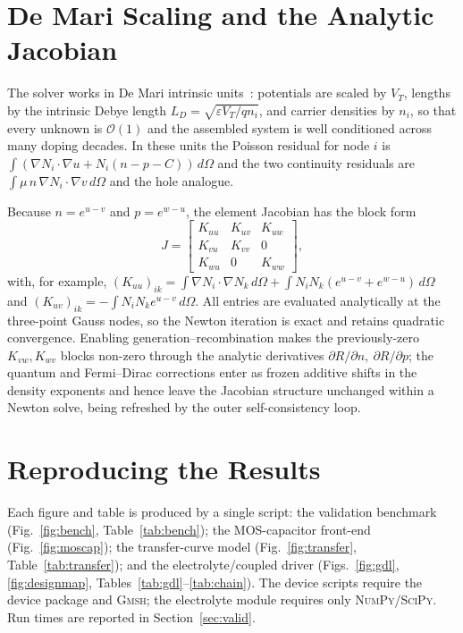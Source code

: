 \documentclass[10pt,journal]{IEEEtran}
\begin{document}
\section{De Mari Scaling and the Analytic Jacobian}
\label{app:scaling}
The solver works in De Mari intrinsic units~\cite{demari1968}: potentials are
scaled by $V_T$, lengths by the intrinsic Debye length
$L_D=\sqrt{\varepsilon V_T/qn_i}$, and carrier densities by $n_i$, so that every
unknown is $\mathcal{O}(1)$ and the assembled system is well conditioned across
many doping decades. In these units the Poisson residual for node $i$ is
$\int(\nabla N_i\!\cdot\!\nabla u + N_i(n-p-C))\,d\Omega$ and the two continuity
residuals are $\int\mu\, n\,\nabla N_i\!\cdot\!\nabla v\,d\Omega$ and the hole
analogue.

Because $n=e^{u-v}$ and $p=e^{w-u}$, the element Jacobian has the block form
\begin{equation}
J=\begin{bmatrix} K_{uu} & K_{uv} & K_{uw}\\ K_{vu} & K_{vv} & 0\\ K_{wu} & 0 & K_{ww}\end{bmatrix},
\end{equation}
with, for example,
$(K_{uu})_{ik}=\int\nabla N_i\!\cdot\!\nabla N_k\,d\Omega+\int N_iN_k(e^{u-v}+e^{w-u})\,d\Omega$
and $(K_{uv})_{ik}=-\int N_iN_k e^{u-v}\,d\Omega$. All entries are evaluated
analytically at the three-point Gauss nodes, so the Newton iteration is exact and
retains quadratic convergence. Enabling generation--recombination makes the
previously-zero $K_{vw},K_{wv}$ blocks non-zero through the analytic derivatives
$\partial R/\partial n,\ \partial R/\partial p$; the quantum and Fermi--Dirac
corrections enter as frozen additive shifts in the density exponents and hence
leave the Jacobian structure unchanged within a Newton solve, being refreshed by
the outer self-consistency loop.

\section{Reproducing the Results}
\label{app:repro}
Each figure and table is produced by a single script: the validation benchmark
(Fig.~\ref{fig:bench}, Table~\ref{tab:bench}); the MOS-capacitor front-end
(Fig.~\ref{fig:moscap}); the transfer-curve model (Fig.~\ref{fig:transfer},
Table~\ref{tab:transfer}); and the electrolyte/coupled driver
(Figs.~\ref{fig:gdl}, \ref{fig:designmap}, Tables~\ref{tab:gdl}--\ref{tab:chain}).
The device scripts require the device package and \textsc{Gmsh}; the electrolyte
module requires only \textsc{NumPy}/\textsc{SciPy}. Run times are reported in
Section~\ref{sec:valid}.



\end{document}
